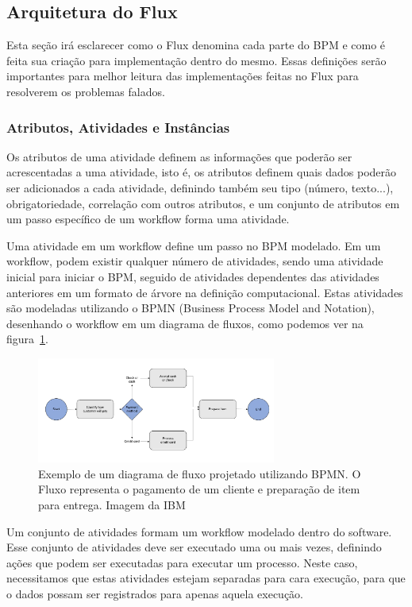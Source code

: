 \subsection{Arquitetura do Flux}

Esta seção irá esclarecer como o Flux denomina cada parte do BPM e como é feita sua criação para implementação dentro do mesmo. Essas definições serão importantes para melhor leitura das implementações feitas no Flux para resolverem os problemas falados.

\subsubsection{Atributos, Atividades e Instâncias}

Os atributos de uma atividade definem as informações que poderão ser acrescentadas a uma atividade, isto é, os atributos definem quais dados poderão ser adicionados a cada atividade, definindo também seu tipo (número, texto...), obrigatoriedade, correlação com outros atributos, e um conjunto de atributos em um passo específico de um workflow forma uma atividade.

Uma atividade em um workflow define um passo no BPM modelado. Em um workflow, podem existir qualquer número de atividades, sendo uma atividade inicial para iniciar o BPM, seguido de atividades dependentes das atividades anteriores em um formato de árvore na definição computacional. Estas atividades são modeladas utilizando o BPMN (Business Process Model and Notation), desenhando o workflow em um diagrama de fluxos, como podemos ver na figura~\ref{fig:bpmn_diagram}.

\begin{figure}
    \centering
    \includegraphics[width=0.7\textwidth]{imgs/BPM/bpmn_diagram.png}
    \caption{Exemplo de um diagrama de fluxo projetado utilizando BPMN. O Fluxo representa o pagamento de um cliente e preparação de item para entrega. Imagem da IBM~\cite{TheIBM}}
    \label{fig:bpmn_diagram}
\end{figure}

Um conjunto de atividades formam um workflow modelado dentro do software. Esse conjunto de atividades deve ser executado uma ou mais vezes, definindo ações que podem ser executadas para executar um processo. Neste caso, necessitamos que estas atividades estejam separadas para cara execução, para que o dados possam ser registrados para apenas aquela execução.

